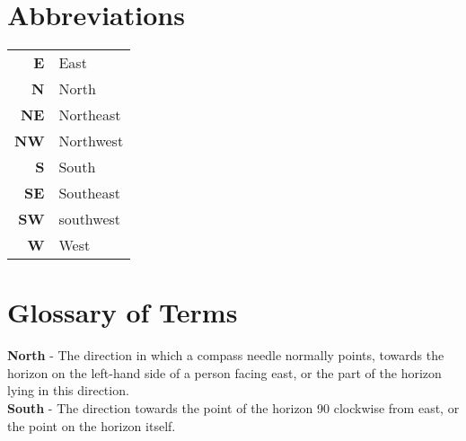 \chapter*{Abbreviations}

\begin{table}[ht!]
\begin{tabular}{r l}
\textbf{E}		& East									\\
\textbf{N}		& North									\\
\textbf{NE}		& Northeast								\\
\textbf{NW}		& Northwest								\\
\textbf{S}		& South									\\
\textbf{SE}		& Southeast								\\
\textbf{SW}		& southwest								\\
\textbf{W}		& West								
\end{tabular}
\end{table}

{\let\clearpage\relax\chapter*{Glossary of Terms}}

\textbf{North} - The direction in which a compass needle normally points, towards the horizon on the left-hand side of a person facing east, or the part of the horizon lying in this direction.\\
\textbf{South} -  The direction towards the point of the horizon 90 clockwise from east, or the point on the horizon itself.
